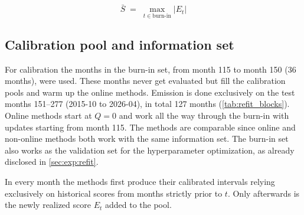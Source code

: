 \begin{equation}
  \bar S \;=\; \max_{t \in \text{burn-in}} \big| E_t \big|
  \label{eq:burnin-scale}
\end{equation}

\subsection{Calibration pool and information set}
\label{sec:conformal:pool}
For calibration the months in the burn-in set, from month 115 to month 150 (36 months), were used. These months never get evaluated but fill the calibration pools and warm up the online methods. Emission is done exclusively on the test months 151--277 (2015-10 to 2026-04), in total 127 months (\cref{tab:refit_blocks}). Online methods start at $Q=0$ and work all the way through the burn-in with updates starting from month 115. The methods are comparable since online and non-online methods both work with the same information set. The burn-in set also works as the validation set for the hyperparameter optimization, as already disclosed in \cref{sec:exp:refit}.


In every month the methods first produce their calibrated intervals relying exclusively on historical scores from months strictly prior to $t$. Only afterwards is the newly realized score $E_t$ added to the pool.


